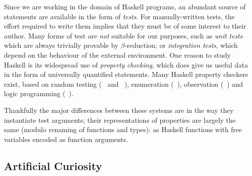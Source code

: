 {Since we are working in the domain of Haskell programs, an abundant source of
statements are available in the form of \emph{tests}. For manually-written
tests, the effort required to write them implies that they must be of some
interest to their author. Many forms of test are \emph{not} suitable for our
purposes, such as \emph{unit tests} which are always trivially provable by
$\beta$-reduction; or \emph{integration tests}, which depend on the behaviour of
the external environment. One reason to study Haskell is its widespread use of
\emph{property checking}, which does give us useful data in the form of
universally quantified statements. Many Haskell property checkers exist, based
on random testing (\quickcheck{}~\cite{claessen2011quickcheck} and
\smartcheck{}~\cite{pike2014smartcheck}), enumeration
(\smallcheck{}~\cite{runciman2008smallcheck}), observation
(\lazysmallcheck{}~\cite{reich2013advances}) and logic programming
(\sparsecheck{}~\cite{sparsecheck}).

Thankfully the major differences between these systems are in the way they
instantiate test arguments; their representations of properties are largely the
same (modulo renaming of functions and types): as Haskell functions with free
variables encoded as function arguments.

\subsection{Artificial Curiosity} \label{sec:intrinsic}

\begin{figure}
  \centering
\end{figure}}
